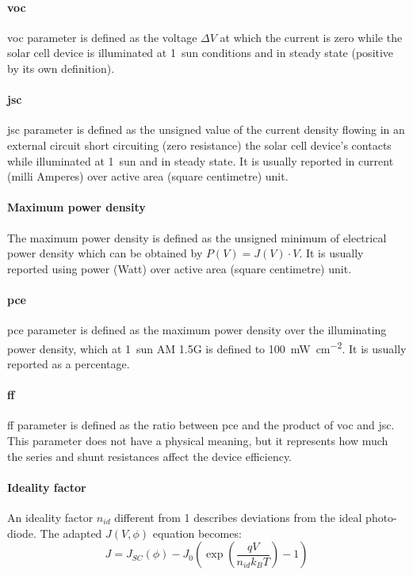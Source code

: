\paragraph{\Glsdesc{voc}} \Gls{voc} parameter is defined as the voltage $\Delta V$ at which the current is zero while the solar cell device is illuminated at 1~sun conditions and in steady state (positive by its own definition).

\paragraph{\Glsdesc{jsc}} \Gls{jsc} parameter is defined as the unsigned value of the current density flowing in an external circuit short circuiting (zero resistance) the solar cell device's contacts while illuminated at 1~sun and in steady state. It is usually reported in current (milli Amperes) over active area (square centimetre) unit.

\paragraph{Maximum power density} The maximum power density is defined as the unsigned minimum of electrical power density which can be obtained by $P(V) = J(V) \cdot V$. It is usually reported using power (Watt) over active area (square centimetre) unit.

\paragraph{\Glsdesc{pce}} \Gls{pce} parameter is defined as the maximum power density over the illuminating power density, which at 1~sun AM 1.5G is defined to \SI{100}{\mW\per\square\cm}. It is usually reported as a percentage.

\paragraph{\Glsdesc{ff}} \Gls{ff} parameter is defined as the ratio between \gls{pce} and the product of \gls{voc} and \gls{jsc}. This parameter does not have a physical meaning, but it represents how much the series and shunt resistances affect the device efficiency.

\paragraph{Ideality factor} An ideality factor $n_{id}$ different from 1 describes deviations from the ideal photo-diode. The adapted $J(V,\phi)$ equation becomes\cite{Calado2018b}:
\begin{equation} \label{eq:photodiode}
J = J_{SC}(\phi) - J_0\left(\exp\left(\frac{qV}{n_{id}k_BT}\right)-1\right)
\end{equation}

